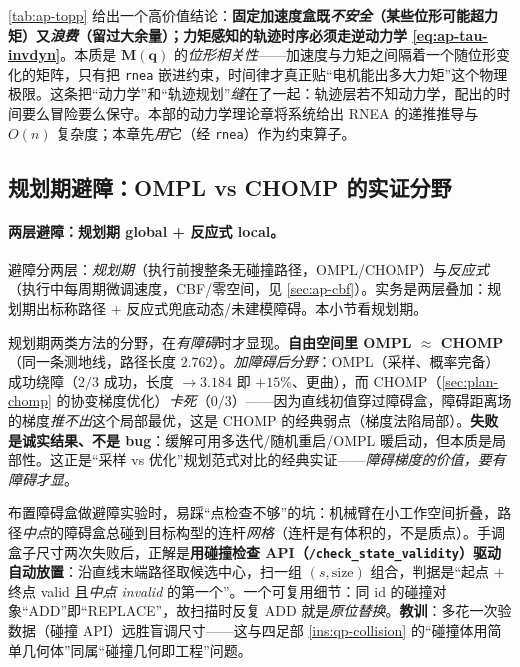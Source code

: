 \begin{insight}[力矩感知的时序必须走逆动力学]\label{ins:ap-torque-topp}
\cref{tab:ap-topp} 给出一个高价值结论：\textbf{固定加速度盒既\emph{不安全}（某些位形可能超力矩）又\emph{浪费}（留过大余量）；力矩感知的轨迹时序必须走逆动力学 \cref{eq:ap-tau-invdyn}}。本质是 $\mathbf{M}(\mathbf{q})$ 的\emph{位形相关性}——加速度与力矩之间隔着一个随位形变化的矩阵，只有把 \texttt{rnea} 嵌进约束，时间律才真正贴“电机能出多大力矩”这个物理极限。这条把“动力学”和“轨迹规划”\emph{缝}在了一起：轨迹层若不知动力学，配出的时间要么冒险要么保守。本部的动力学理论章将系统给出 RNEA 的递推推导与 $O(n)$ 复杂度；本章先\emph{用}它（经 \texttt{rnea}）作为约束算子。
\end{insight}

\subsection{规划期避障：OMPL vs CHOMP 的实证分野}
\label{sec:ap-planavoid}

\paragraph{两层避障：规划期 global + 反应式 local。}
避障分两层：\emph{规划期}（执行前搜整条无碰撞路径，OMPL/CHOMP）与\emph{反应式}（执行中每周期微调速度，CBF/零空间，见 \cref{sec:ap-cbf}）。实务是两层叠加：规划期出标称路径 + 反应式兜底动态/未建模障碍。本小节看规划期。

\begin{insight}\label{ins:ap-ompl-chomp}
规划期两类方法的分野，在\emph{有障碍}时才显现。\textbf{自由空间里 OMPL $\approx$ CHOMP}（同一条测地线，路径长度 $2.762$）。\emph{加障碍后分野}：OMPL（采样、概率完备）成功绕障（$2/3$ 成功，长度 $\to 3.184$ 即 $+15\%$、更曲），而 CHOMP（\cref{sec:plan-chomp} 的协变梯度优化）\emph{卡死}（$0/3$）——因为直线初值穿过障碍盒，障碍距离场的梯度\emph{推不出}这个局部最优，这是 CHOMP 的经典弱点（梯度法陷局部）。\textbf{失败是诚实结果、不是 bug}：缓解可用多迭代/随机重启/OMPL 暖启动，但本质是局部性。这正是“采样 vs 优化”规划范式对比的经典实证——\emph{障碍梯度的价值，要有障碍才显}。
\end{insight}

\begin{pitfall}\label{pit:ap-collision-volume}
布置障碍盒做避障实验时，易踩“点检查不够”的坑：机械臂在小工作空间折叠，路径\emph{中点}的障碍盒总碰到目标构型的连杆\emph{网格}（连杆是有体积的，不是质点）。手调盒子尺寸两次失败后，正解是\textbf{用碰撞检查 API（\texttt{/\allowbreak check\_state\_validity}）驱动自动放置}：沿直线末端路径取候选中心，扫一组 $(s,\text{size})$ 组合，判据是“起点 $+$ 终点 valid 且\emph{中点 invalid} 的第一个”。一个可复用细节：同 id 的碰撞对象“ADD”即“REPLACE”，故扫描时反复 ADD 就是\emph{原位替换}。\textbf{教训}：多花一次验数据（碰撞 API）远胜盲调尺寸——这与四足部 \cref{ins:qp-collision} 的“碰撞体用简单几何体”同属“碰撞几何即工程”问题。
\end{pitfall}

